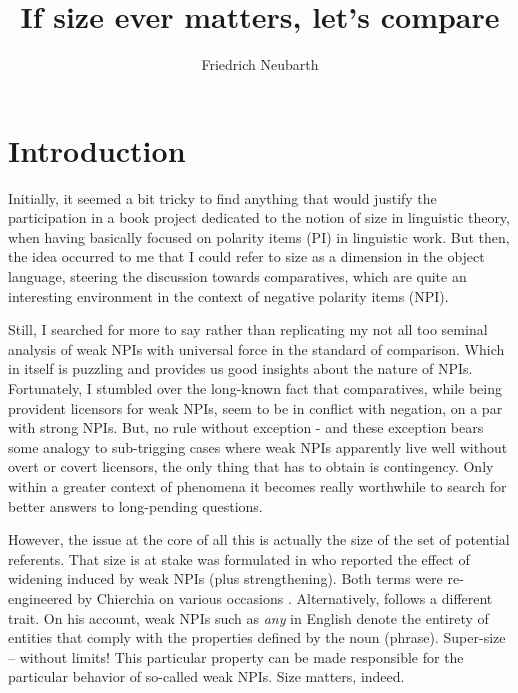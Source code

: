 \documentclass[output=paper,colorlinks,citecolor=brown,
]{langscibook}
\author{Friedrich Neubarth\affiliation{Austrian Research Institute f. Artificial Intelligence (OFAI), Univ. of Vienna}}
\title{If size ever matters, let's compare}
\begin{document}
\maketitle


\section{Introduction}

Initially, it seemed a bit tricky to find anything that would justify the participation in a book project dedicated to
the notion of size in linguistic theory, when having basically focused on polarity items (PI) in linguistic work. But
then, the idea occurred to me that I could refer to size as a dimension in the object language, steering the discussion
towards comparatives, which are quite an interesting environment in the context of negative polarity items (NPI).

Still, I searched for more to say rather than replicating my not all too seminal analysis of weak NPIs with universal
force in the standard of comparison. Which in itself is puzzling and provides us good insights about the nature of
NPIs. Fortunately, I stumbled over the long-known fact that comparatives, while being provident licensors for weak NPIs,
seem to be in conflict with negation, on a par with strong NPIs. But, no rule without exception - and these exception
bears some analogy to sub-trigging cases where weak NPIs apparently live well without overt or covert licensors, the
only thing that has to obtain is contingency. Only within a greater context of phenomena it becomes really worthwhile
to search for better answers to long-pending questions.

However, the issue at the core of all this is actually the size of the set of potential referents. That size is at
stake was formulated in \citet{kadmonlandmann1993} who reported the effect of widening induced by weak NPIs (plus
strengthening). Both terms were re-engineered by Chierchia on various occasions \citet{chierchia2004,chierchia2013}.
Alternatively, \citet{krifka1995} follows a different trait. On his account, weak NPIs such as \textit{any} in English
denote the entirety of entities that comply with the properties defined by the noun (phrase). Super-size -- without limits!
This particular property can be made responsible for the particular behavior of so-called weak NPIs. Size matters,
indeed.
\end{document}
